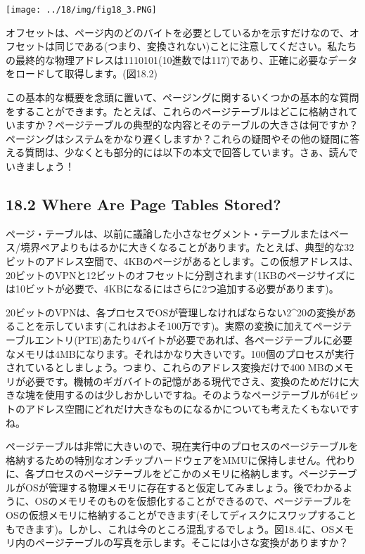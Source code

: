 \texttt{[image: ../18/img/fig18\_3.PNG]}

オフセットは、ページ内のどのバイトを必要としているかを示すだけなので、オフセットは同じである(つまり、変換されない)ことに注意してください。私たちの最終的な物理アドレスは1110101(10進数では117)であり、正確に必要なデータをロードして取得します。(図18.2)

この基本的な概要を念頭に置いて、ページングに関するいくつかの基本的な質問をすることができます。たとえば、これらのページテーブルはどこに格納されていますか？ページテーブルの典型的な内容とそのテーブルの大きさは何ですか？ページングはシステムをかなり遅くしますか？これらの疑問やその他の疑問に答える質問は、少なくとも部分的には以下の本文で回答しています。さぁ、読んでいきましょう！

\hypertarget{where-are-page-tables-stored}{%
\subsection*{18.2 Where Are Page Tables
Stored?}\label{where-are-page-tables-stored}}

ページ・テーブルは、以前に議論した小さなセグメント・テーブルまたはベース/境界ペアよりもはるかに大きくなることがあります。たとえば、典型的な32ビットのアドレス空間で、4KBのページがあるとします。この仮想アドレスは、20ビットのVPNと12ビットのオフセットに分割されます(1KBのページサイズには10ビットが必要で、4KBになるにはさらに2つ追加する必要があります)。

20ビットのVPNは、各プロセスでOSが管理しなければならない2\^{}20の変換があることを示しています(これはおよそ100万です)。実際の変換に加えてページテーブルエントリ(PTE)あたり4バイトが必要であれば、各ページテーブルに必要なメモリは4MBになります。それはかなり大きいです。100個のプロセスが実行されているとしましょう。つまり、これらのアドレス変換だけで400
MBのメモリが必要です。機械のギガバイトの記憶がある現代でさえ、変換のためだけに大きな塊を使用するのは少しおかしいですね。そのようなページテーブルが64ビットのアドレス空間にどれだけ大きなものになるかについても考えたくもないですね。

ページテーブルは非常に大きいので、現在実行中のプロセスのページテーブルを格納するための特別なオンチップハードウェアをMMUに保持しません。代わりに、各プロセスのページテーブルをどこかのメモリに格納します。ページテーブルがOSが管理する物理メモリに存在すると仮定してみましょう。後でわかるように、OSのメモリそのものを仮想化することができるので、ページテーブルをOSの仮想メモリに格納することができます(そしてディスクにスワップすることもできます)。しかし、これは今のところ混乱するでしょう。図18.4に、OSメモリ内のページテーブルの写真を示します。そこには小さな変換がありますか？

